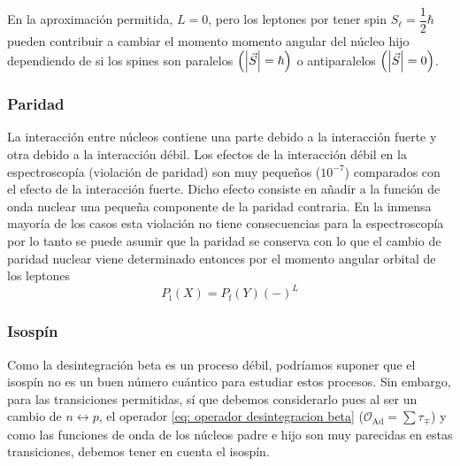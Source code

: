 En la aproximación permitida, $L=0$, pero los leptones por tener spin $S_\ell=\dfrac{1}{2}\hbar$ pueden contribuir a cambiar el momento momento angular del núcleo hijo dependiendo de si los spines son paralelos $\qty(\abs{\vec{S}}=\hbar)$ o antiparalelos $\qty(\abs{\vec{S}}=0)$.
\subsubsection{Paridad}
La interacción entre núcleos contiene una parte debido a la interacción fuerte y otra debido a la interacción débil. Los efectos de la interacción débil en la espectroscopía (violación de paridad) son muy pequeños ($10^{-7}$) comparados con el efecto de la interacción fuerte. Dicho efecto consiste en añadir a la función de onda nuclear una pequeña componente de la paridad contraria. En la inmensa mayoría de los casos esta violación no tiene consecuencias para la espectroscopía por lo tanto se puede asumir que la paridad se conserva con lo que el cambio de paridad nuclear viene determinado entonces por el momento angular orbital de los leptones
\begin{equation*}
    P_\mathrm{i}(X)=P_\mathrm{f}(Y)(-)^L
\end{equation*}

\subsubsection{Isospín}
Como la desintegración beta es un proceso débil, podríamos suponer que el isospín no es un buen número cuántico para estudiar estos procesos. Sin embargo, para las transiciones permitidas, sí que debemos considerarlo pues al ser un cambio de $n\leftrightarrow p$, el operador \ref{eq: operador desintegracion beta} ($\mathcal{O}_\mathrm{Ad}=\sum \tau_\mp$) y como las funciones de onda de los núcleos padre e hijo son muy parecidas en estas transiciones, debemos tener en cuenta el isospín.

